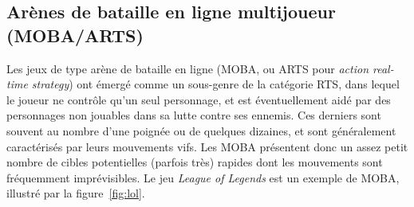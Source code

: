 	\subsection{Arènes de bataille en ligne multijoueur (MOBA/ARTS)}
	Les jeux de type arène de bataille en ligne (MOBA, ou ARTS pour \emph{action real-time strategy}) ont émergé comme un sous-genre de la catégorie RTS, dans lequel le joueur ne contrôle qu'un seul personnage, et est éventuellement aidé par des personnages non jouables\footnotemark{} dans sa lutte contre ses ennemis. Ces derniers sont souvent au nombre d'une poignée ou de quelques dizaines, et sont généralement caractérisés par leurs mouvements vifs. Les MOBA présentent donc un assez petit nombre de cibles potentielles (parfois très) rapides dont les mouvements sont fréquemment imprévisibles. Le jeu \emph{League of Legends} est un exemple de MOBA, illustré par la figure~\ref{fig:lol}.
	
	
